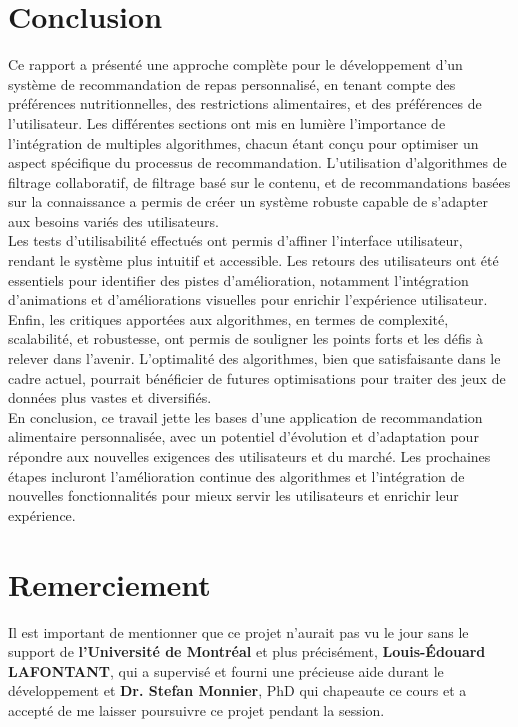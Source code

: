 \documentclass[11pt]{article}
\begin{document}
\section{Conclusion}
Ce rapport a présenté une approche complète pour le développement d'un système de recommandation de repas personnalisé, en tenant compte des préférences nutritionnelles, des restrictions alimentaires, et des préférences de l'utilisateur. Les différentes sections ont mis en lumière l'importance de l'intégration de multiples algorithmes, chacun étant conçu pour optimiser un aspect spécifique du processus de recommandation. L'utilisation d'algorithmes de filtrage collaboratif, de filtrage basé sur le contenu, et de recommandations basées sur la connaissance a permis de créer un système robuste capable de s'adapter aux besoins variés des utilisateurs.\\

Les tests d'utilisabilité effectués ont permis d'affiner l'interface utilisateur, rendant le système plus intuitif et accessible. Les retours des utilisateurs ont été essentiels pour identifier des pistes d'amélioration, notamment l'intégration d'animations et d'améliorations visuelles pour enrichir l'expérience utilisateur.\\

Enfin, les critiques apportées aux algorithmes, en termes de complexité, scalabilité, et robustesse, ont permis de souligner les points forts et les défis à relever dans l'avenir. L'optimalité des algorithmes, bien que satisfaisante dans le cadre actuel, pourrait bénéficier de futures optimisations pour traiter des jeux de données plus vastes et diversifiés.\\

En conclusion, ce travail jette les bases d'une application de recommandation alimentaire personnalisée, avec un potentiel d'évolution et d'adaptation pour répondre aux nouvelles exigences des utilisateurs et du marché. Les prochaines étapes incluront l'amélioration continue des algorithmes et l'intégration de nouvelles fonctionnalités pour mieux servir les utilisateurs et enrichir leur expérience.

\section*{Remerciement}
Il est important de mentionner que ce projet n’aurait pas vu le jour sans le support de \textbf{l’Université de 
Montréal} et plus précisément, \textbf{Louis-Édouard LAFONTANT}, qui a supervisé et fourni une 
précieuse aide durant le développement et \textbf{Dr. Stefan Monnier}, PhD qui chapeaute ce cours et a accepté de me 
laisser poursuivre ce projet pendant la session.
\end{document}

